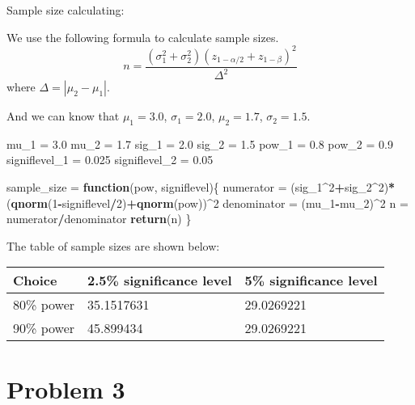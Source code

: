 \documentclass[]{article}
\newenvironment{Shaded}{\begin{snugshade}}{\end{snugshade}}
\newcommand{\KeywordTok}[1]{\textcolor[rgb]{0.13,0.29,0.53}{\textbf{#1}}}
\newcommand{\DecValTok}[1]{\textcolor[rgb]{0.00,0.00,0.81}{#1}}
\newcommand{\FloatTok}[1]{\textcolor[rgb]{0.00,0.00,0.81}{#1}}
\newcommand{\StringTok}[1]{\textcolor[rgb]{0.31,0.60,0.02}{#1}}
\newcommand{\ControlFlowTok}[1]{\textcolor[rgb]{0.13,0.29,0.53}{\textbf{#1}}}
\newcommand{\OperatorTok}[1]{\textcolor[rgb]{0.81,0.36,0.00}{\textbf{#1}}}
\newcommand{\NormalTok}[1]{#1}
\begin{document}
Sample size calculating:

We use the following formula to calculate sample sizes.
\[ n=\frac{(\sigma_1^2+\sigma_2^2)(z_{1-\alpha/2}+z_{1-\beta})^2}{\Delta^2} \]
where \(\Delta=|\mu_2-\mu_1|\).

And we can know that \(\mu_1=3.0\), \(\sigma_1=2.0\), \(\mu_2=1.7\),
\(\sigma_2=1.5\).

\begin{Shaded}
\begin{Highlighting}[]
\NormalTok{mu_}\DecValTok{1}\NormalTok{ =}\StringTok{ }\FloatTok{3.0}
\NormalTok{mu_}\DecValTok{2}\NormalTok{ =}\StringTok{ }\FloatTok{1.7}
\NormalTok{sig_}\DecValTok{1}\NormalTok{ =}\StringTok{ }\FloatTok{2.0}
\NormalTok{sig_}\DecValTok{2}\NormalTok{ =}\StringTok{ }\FloatTok{1.5}
\NormalTok{pow_}\DecValTok{1}\NormalTok{ =}\StringTok{ }\FloatTok{0.8}
\NormalTok{pow_}\DecValTok{2}\NormalTok{ =}\StringTok{ }\FloatTok{0.9}
\NormalTok{signiflevel_}\DecValTok{1}\NormalTok{ =}\StringTok{ }\FloatTok{0.025}
\NormalTok{signiflevel_}\DecValTok{2}\NormalTok{ =}\StringTok{ }\FloatTok{0.05}

\NormalTok{sample_size =}\StringTok{ }\ControlFlowTok{function}\NormalTok{(pow, signiflevel)\{}
\NormalTok{  numerator =}\StringTok{ }\NormalTok{(sig_}\DecValTok{1}\OperatorTok{^}\DecValTok{2}\OperatorTok{+}\NormalTok{sig_}\DecValTok{2}\OperatorTok{^}\DecValTok{2}\NormalTok{)}\OperatorTok{*}\NormalTok{(}\KeywordTok{qnorm}\NormalTok{(}\DecValTok{1}\OperatorTok{-}\NormalTok{signiflevel}\OperatorTok{/}\DecValTok{2}\NormalTok{)}\OperatorTok{+}\KeywordTok{qnorm}\NormalTok{(pow))}\OperatorTok{^}\DecValTok{2}
\NormalTok{  denominator =}\StringTok{ }\NormalTok{(mu_}\DecValTok{1}\OperatorTok{-}\NormalTok{mu_}\DecValTok{2}\NormalTok{)}\OperatorTok{^}\DecValTok{2}
\NormalTok{  n =}\StringTok{ }\NormalTok{numerator}\OperatorTok{/}\NormalTok{denominator}
  \KeywordTok{return}\NormalTok{(n)}
\NormalTok{\}}
\end{Highlighting}
\end{Shaded}

The table of sample sizes are shown below:

\begin{longtable}[]{@{}lll@{}}
\toprule
Choice & 2.5\% significance level & 5\% significance
level\tabularnewline
\midrule
\endhead
80\% power & 35.1517631 & 29.0269221\tabularnewline
90\% power & 45.899434 & 29.0269221\tabularnewline
\bottomrule
\end{longtable}

\section{Problem 3}\label{problem-3}
\end{document}
